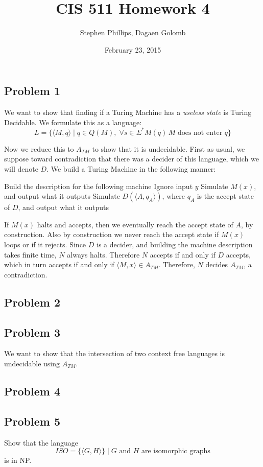 \documentclass[english]{article}
\title{CIS 511 Homework 4}
\author{Stephen Phillips, Dagaen Golomb}
\date{February 23, 2015}
\begin{document}
\maketitle
\subsection*{Problem 1}
We want to show that finding if a Turing Machine has a \textit{useless state}
is Turing Decidable. We formulate this as a language:
\[ L = \{ \langle M, q \rangle \mid
   q \in Q(M), \;
   \forall s \in \Sigma^* M(q) \, M\textrm{ does not enter }q \} \]

Now we reduce this to $A_{TM}$ to show that it is undecidable. First as usual, 
we suppose toward contradiction that there was a decider of this language, which
we will denote $D$. We build a Turing Machine in the following manner:
\begin{algorithmic}
\State Build the description for the following machine
		\State Ignore input $y$
		\State Simulate $M(x)$, and output what it outputs
	\EndFunction
\State Simulate $D(\langle A, q_A \rangle)$, where $q_A$ is the accept state
		of $D$, and output what it outputs
\EndFunction 
\end{algorithmic}

If $M(x)$ halts and accepts, then we eventually reach the accept state of $A$,
by construction. Also by construction we never reach the accept state if $M(x)$
loops or if it rejects. Since $D$ is a decider, and building the machine
description takes finite time, $N$ always halts. Therefore $N$ accepts if and
only if $D$ accepts, which in turn accepts if and only if
$\langle M,x \rangle \in A_{TM}$. Therefore, $N$ decides $A_{TM}$, a
contradiction. 

\subsection*{Problem 2}
\subsection*{Problem 3}
We want to show that the intersection of two context free languages is
undecidable using $A_{TM}$. 

\subsection*{Problem 4}
\subsection*{Problem 5}
Show that the language
\[ ISO = \{ \langle G, H \rangle \} \mid
		\textrm{$G$ and $H$ are isomorphic graphs} \]
is in NP.
\end{document}
